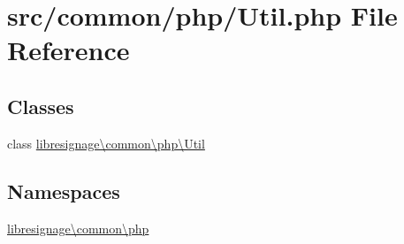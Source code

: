 \hypertarget{Util_8php}{}\section{src/common/php/\+Util.php File Reference}
\label{Util_8php}
\subsection*{Classes}
\begin{DoxyCompactItemize}
\item 
class \hyperlink{classlibresignage_1_1common_1_1php_1_1Util}{libresignage\textbackslash{}common\textbackslash{}php\textbackslash{}\+Util}
\end{DoxyCompactItemize}
\subsection*{Namespaces}
\begin{DoxyCompactItemize}
\item 
 \hyperlink{namespacelibresignage_1_1common_1_1php}{libresignage\textbackslash{}common\textbackslash{}php}
\end{DoxyCompactItemize}
